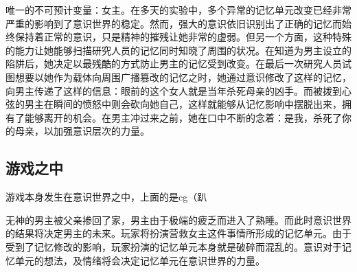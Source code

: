 \documentclass[12pt, a4paper]{article}
\begin{document}
        唯一的不可预计变量：女主。在多天的实验中，多个异常的记忆单元改变已经非常严重的影响到了意识世界的稳定。然而，强大的意识依旧识别出了正确的记忆而始终保持着正常的意识，只是精神的摧残让她非常的虚弱。但另一个方面，这种特殊的能力让她能够扫描研究人员的记忆同时知晓了周围的状况。在知道为男主设立的陷阱后，她决定以最残酷的方式防止男主的记忆受到改变。在最后一次研究人员试图想要以她作为载体向周围广播篡改的记忆之时，她通过意识修改了这样的记忆，向男主传递了这样的信息：眼前的这个女人就是当年杀死母亲的凶手。而被拨到心弦的男主在瞬间的愤怒中则会砍向她自己，这样就能够从记忆影响中摆脱出来，拥有了能够离开的机会。在男主冲过来之前，她在口中不断的念着：是我，杀死了你的母亲，以加强意识层次的力量。
    
        \subsection*{游戏之中}
            游戏本身发生在意识世界之中，上面的是cg（趴

            无神的男主被父亲掺回了家，男主由于极端的疲乏而进入了熟睡。而此时意识世界的结果将决定男主的未来。玩家将扮演营救女主这件事情所形成的记忆单元。由于受到了记忆修改的影响，玩家扮演的记忆单元本身就是破碎而混乱的。意识对于记忆单元的想法，及情绪将会决定记忆单元在意识世界的力量。
\end{document}
